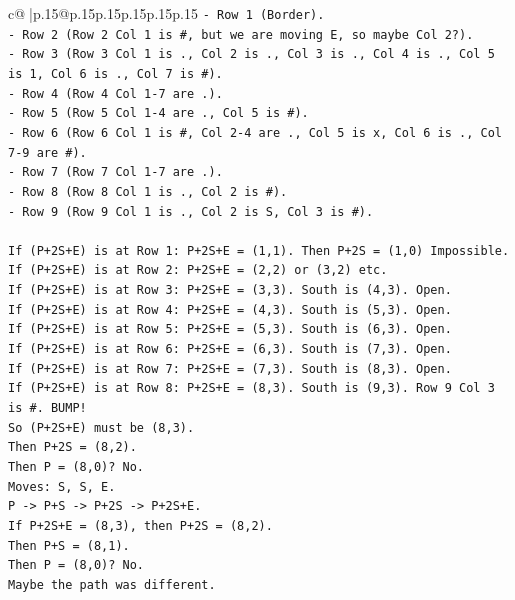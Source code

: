 \documentclass{article}
\begin{document}
{\begin{supertabular}{c@{$\;$}|p{.15\linewidth}@{}p{.15\linewidth}p{.15\linewidth}p{.15\linewidth}p{.15\linewidth}p{.15\linewidth}}
{{{\texttt{{-} Row 1 (Border).} \\
\texttt{{-} Row 2 (Row 2 Col 1 is \#, but we are moving E, so maybe Col 2?).} \\
\texttt{{-} Row 3 (Row 3 Col 1 is ., Col 2 is ., Col 3 is ., Col 4 is ., Col 5 is 1, Col 6 is ., Col 7 is \#).} \\
\texttt{{-} Row 4 (Row 4 Col 1{-}7 are .).} \\
\texttt{{-} Row 5 (Row 5 Col 1{-}4 are ., Col 5 is \#).} \\
\texttt{{-} Row 6 (Row 6 Col 1 is \#, Col 2{-}4 are ., Col 5 is x, Col 6 is ., Col 7{-}9 are \#).} \\
\texttt{{-} Row 7 (Row 7 Col 1{-}7 are .).} \\
\texttt{{-} Row 8 (Row 8 Col 1 is ., Col 2 is \#).} \\
\texttt{{-} Row 9 (Row 9 Col 1 is ., Col 2 is S, Col 3 is \#).} \\
\\ 
\texttt{If (P+2S+E) is at Row 1: P+2S+E = (1,1). Then P+2S = (1,0) Impossible.} \\
\texttt{If (P+2S+E) is at Row 2: P+2S+E = (2,2) or (3,2) etc.} \\
\texttt{If (P+2S+E) is at Row 3: P+2S+E = (3,3). South is (4,3). Open.} \\
\texttt{If (P+2S+E) is at Row 4: P+2S+E = (4,3). South is (5,3). Open.} \\
\texttt{If (P+2S+E) is at Row 5: P+2S+E = (5,3). South is (6,3). Open.} \\
\texttt{If (P+2S+E) is at Row 6: P+2S+E = (6,3). South is (7,3). Open.} \\
\texttt{If (P+2S+E) is at Row 7: P+2S+E = (7,3). South is (8,3). Open.} \\
\texttt{If (P+2S+E) is at Row 8: P+2S+E = (8,3). South is (9,3). Row 9 Col 3 is \#. BUMP!} \\
\texttt{So (P+2S+E) must be (8,3).} \\
\texttt{Then P+2S = (8,2).} \\
\texttt{Then P = (8,0)? No.} \\
\texttt{Moves: S, S, E.} \\
\texttt{P {-}> P+S {-}> P+2S {-}> P+2S+E.} \\
\texttt{If P+2S+E = (8,3), then P+2S = (8,2).} \\
\texttt{Then P+S = (8,1).} \\
\texttt{Then P = (8,0)? No.} \\
\texttt{Maybe the path was different.} \\
}}}
\end{supertabular}}
\end{document}

